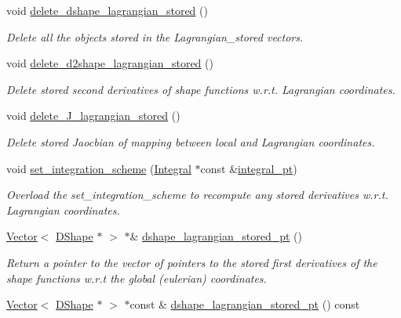 \begin{DoxyCompactItemize}
void \hyperlink{classoomph_1_1StorableShapeSolidElementBase_ae96e6b54024149a8673671f1c418eb06}{delete\+\_\+dshape\+\_\+lagrangian\+\_\+stored} ()
\begin{DoxyCompactList}\small\item\em Delete all the objects stored in the Lagrangian\+\_\+stored vectors. \end{DoxyCompactList}\item 
void \hyperlink{classoomph_1_1StorableShapeSolidElementBase_ac91c1ee2d7543ba8d944a0d8d4f6c10c}{delete\+\_\+d2shape\+\_\+lagrangian\+\_\+stored} ()
\begin{DoxyCompactList}\small\item\em Delete stored second derivatives of shape functions w.\+r.\+t. Lagrangian coordinates. \end{DoxyCompactList}\item 
void \hyperlink{classoomph_1_1StorableShapeSolidElementBase_a7e3086e795309d9992853eaf716e1ef6}{delete\+\_\+\+J\+\_\+lagrangian\+\_\+stored} ()
\begin{DoxyCompactList}\small\item\em Delete stored Jaocbian of mapping between local and Lagrangian coordinates. \end{DoxyCompactList}\item 
void \hyperlink{classoomph_1_1StorableShapeSolidElementBase_acca94924abe9b0a0572ed0a73efb600a}{set\+\_\+integration\+\_\+scheme} (\hyperlink{classoomph_1_1Integral}{Integral} $\ast$const \&\hyperlink{classoomph_1_1FiniteElement_a751dc02ff1325f799840d79ee415753a}{integral\+\_\+pt})
\begin{DoxyCompactList}\small\item\em Overload the set\+\_\+integration\+\_\+scheme to recompute any stored derivatives w.\+r.\+t. Lagrangian coordinates. \end{DoxyCompactList}\item 
\hyperlink{classoomph_1_1Vector}{Vector}$<$ \hyperlink{classoomph_1_1DShape}{D\+Shape} $\ast$ $>$ $\ast$\& \hyperlink{classoomph_1_1StorableShapeSolidElementBase_ace2ecd55ee9e6912c34dda8751c50e34}{dshape\+\_\+lagrangian\+\_\+stored\+\_\+pt} ()
\begin{DoxyCompactList}\small\item\em Return a pointer to the vector of pointers to the stored first derivatives of the shape functions w.\+r.\+t the global (eulerian) coordinates. \end{DoxyCompactList}\item 
\hyperlink{classoomph_1_1Vector}{Vector}$<$ \hyperlink{classoomph_1_1DShape}{D\+Shape} $\ast$ $>$ $\ast$const  \& \hyperlink{classoomph_1_1StorableShapeSolidElementBase_ac10eb02930b7e5a08ce506eb2e2b6614}{dshape\+\_\+lagrangian\+\_\+stored\+\_\+pt} () const

\end{DoxyCompactItemize}
